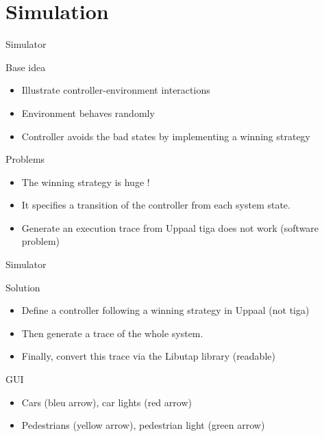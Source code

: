 \documentclass{bredelebeamer}
\begin{document}
\section{Simulation}
\begin{frame}{Simulator}

\begin{block}{Base idea}
\begin{itemize}
\item Illustrate controller-environment interactions 
\item Environment behaves randomly
\item Controller avoids the bad states by implementing a winning strategy
\end{itemize}
\end{block}

\begin{block}{Problems}

\begin{itemize}
\item The winning strategy is huge ! 
\item It specifies a transition of the controller from each system state. 
\item Generate an execution trace from Uppaal tiga does not work (software problem)
\end{itemize}

\end{block}

\end{frame}

\begin{frame}{Simulator}

\begin{block}{Solution }
\begin{itemize}
\item Define a controller following a winning strategy in Uppaal (not tiga)
\item Then generate a trace of the whole system. 
\item Finally, convert this trace via the Libutap library (readable)
\end{itemize}
\end{block}

\begin{block}{GUI}
\begin{itemize}
\item Cars (bleu arrow), car lights (red arrow)
\item Pedestrians (yellow arrow), pedestrian light (green arrow)
\end{itemize}

\end{block}



\end{frame}
\end{document}

